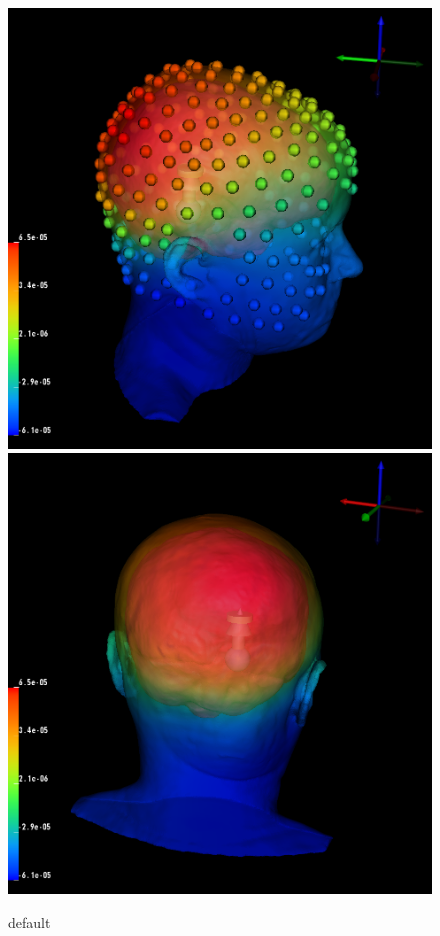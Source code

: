\begin{figure}[H]
\begin{center}
\includegraphics[width=.49\textwidth]{Figures/iso_dipole}
\includegraphics[width=.49\textwidth]{Figures/iso_dipole_2}
\caption{default}
\label{default}
\end{center}
\end{figure}

